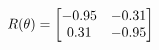 \documentclass[preview]{standalone}
\begin{document}
\begin{align*}
\special{dvisvgm:raw <g id='unique000'>}R(\theta) = \begin{bmatrix}-0.95 & -0.31\\0.31 & -0.95\end{bmatrix}\special{dvisvgm:raw </g>}
\end{align*}
\end{document}

